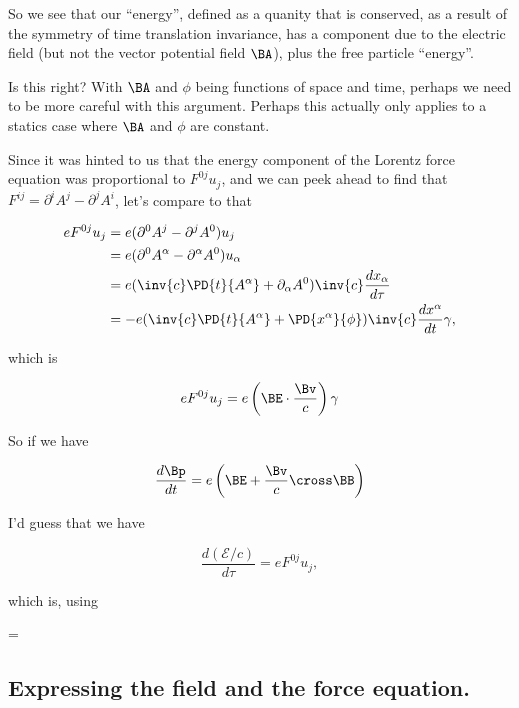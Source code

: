 So we see that our ``energy'', defined as a quanity that is conserved, as a result of the symmetry of time translation invariance, has a component due to the electric field (but not the vector potential field $\BA$), plus the free particle ``energy''.

Is this right?  With $\BA$ and $\phi$ being functions of space and time, perhaps we need to be more careful with this argument.  Perhaps this actually only applies to a statics case where $\BA$ and $\phi$ are constant.

Since it was hinted to us that the energy component of the Lorentz force equation was proportional to $F^{0j} u_j$, and we can peek ahead to find that $F^{ij} = \partial^i A^j - \partial^j A^i$, let's compare to that

\begin{align*}
e F^{0 j} u_j
&=
e (\partial^0 A^j - \partial^j A^0) u_j \\
&=
e (\partial^0 A^\alpha - \partial^\alpha A^0) u_\alpha \\
&=
e (\inv{c} \PD{t}{A^\alpha} + \partial_\alpha A^0) \inv{c} \frac{dx_\alpha}{d\tau} \\
&=
-e (\inv{c} \PD{t}{A^\alpha} + \PD{x^\alpha}{\phi}) \inv{c} \frac{dx^\alpha}{dt} \gamma,
\end{align*}

which is

\begin{equation}\label{eqn:relativisticElectrodynamicsT3:n}
e F^{0 j} u_j = e \left(\BE \cdot \frac{\Bv}{c}\right) \gamma
\end{equation}

So if we have

\begin{equation}\label{eqn:relativisticElectrodynamicsT3:n}
\frac{d\Bp}{dt} = e \left( \BE + \frac{\Bv}{c} \cross \BB \right)
\end{equation}

I'd guess that we have

\begin{equation}\label{eqn:relativisticElectrodynamicsT3:n}
\frac{d(\mathcal{E}/c)}{d\tau} = e F^{0 j} u_j,
\end{equation}

which is, using

 = 

\subsection{Expressing the field and the force equation.}

